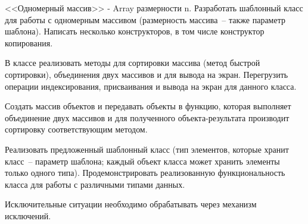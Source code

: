 
<<Одномерный массив>> - Array размерности n. Разработать шаблонный класс для работы
с одномерным массивом (размерность массива~-- также параметр шаблона). Написать
несколько конструкторов, в том числе конструктор копирования.

В классе реализовать
методы для сортировки массива (метод быстрой сортировки), объединения двух массивов
и для вывода на экран. Перегрузить операции индексирования, присваивания и вывода на
экран для данного класса.

Создать массив объектов и передавать объекты в функцию,
которая выполняет объединение двух массивов и для полученного объекта-результата
производит сортировку соответствующим методом.

Реализовать предложенный шаблонный класс (тип элементов, которые
хранит класс~-- параметр шаблона; каждый объект класса может хранить
элементы только одного типа). Продемонстрировать реализованную
функциональность класса для работы с различными типами данных.

Исключительные ситуации необходимо обрабатывать через механизм исключений.
